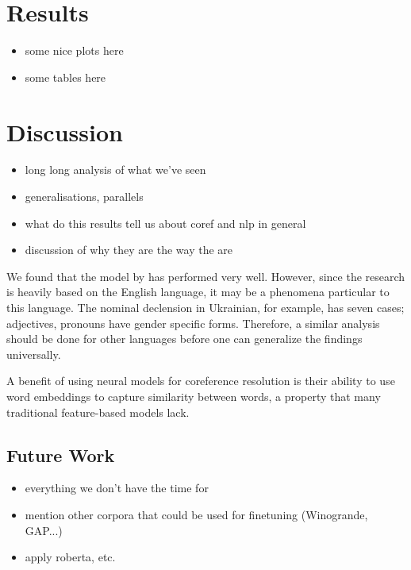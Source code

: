 \documentclass[11pt]{article}
\begin{document}


\section{Results}

\begin{itemize}
\item some nice plots here
\item some tables here
\end{itemize}

\section{Discussion}

\begin{itemize}
\item long long analysis of what we've seen
\item generalisations, parallels
\item what do this results tell us about coref and nlp in general
\item discussion of why they are the way the are
\end{itemize}

We found that the model by \textcite{joshi2019coref} has performed very well. 
However, since the research is heavily based on the English language, it may be a phenomena particular to this language. The nominal declension in Ukrainian, for example, has seven cases; adjectives, pronouns have gender specific forms. Therefore, a similar analysis should be done for other languages before one can generalize the findings universally. %

A benefit of using neural models for coreference resolution is their ability to use
word embeddings to capture similarity between words, a property that many traditional feature-based models lack.

\subsection{Future Work}
\begin{itemize}
\item everything we don't have the time for
\item mention other corpora that could be used for finetuning (Winogrande, GAP...)
\item apply roberta, etc.

\end{itemize}
\end{document}

